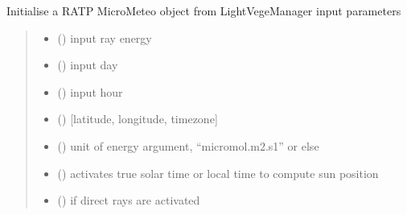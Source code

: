 \documentclass[letterpaper,10pt,english]{sphinxmanual}
\begin{document}
\begin{fulllineitems}
\label{\detokenize{reference:RATPinputs.RATP_meteo}}
\pysigstartsignatures
{}
\pysigstopsignatures
\sphinxAtStartPar
Initialise a RATP MicroMeteo object from LightVegeManager input parameters
\begin{quote}\begin{description}
\begin{itemize}
\item {} 
\sphinxAtStartPar
{} () \textendash{} input ray energy

\item {} 
\sphinxAtStartPar
{} () \textendash{} input day

\item {} 
\sphinxAtStartPar
{} () \textendash{} input hour

\item {} 
\sphinxAtStartPar
{} () \textendash{} {[}latitude, longitude, timezone{]}

\item {} 
\sphinxAtStartPar
{} () \textendash{} unit of energy argument, “micromol.m\sphinxhyphen{}2.s\sphinxhyphen{}1” or else

\item {} 
\sphinxAtStartPar
{} () \textendash{} activates true solar time or local time to compute sun position

\item {} 
\sphinxAtStartPar
{} () \textendash{} if direct rays are activated


\end{itemize}
\end{description}
\end{quote}
\end{fulllineitems}
\end{document}

